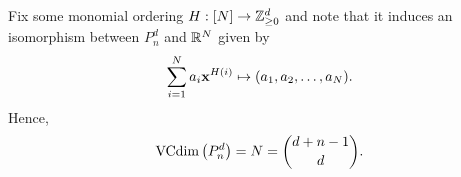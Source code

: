 \begin{ex}
\begin{enumerate}
\begin{enumerate}[1.]
\begin{enumerate}[1.]
                          Fix some monomial ordering $H: [N] \to \mathbb{Z}_{\geq 0}^d$ and
                          note that it induces an isomorphism between
                          $P^d_n$ and $\mathbb{R}^N$ given by
                          \[
                            \sum_{i=1}^N a_i\mathbf{x}^{H(i)} \mapsto (a_1,a_2,\ldots,a_N).
                          \]
                          Hence,
                          \[
                            \operatorname{VCdim}\left(P^d_n\right)=N={d+n-1 \choose d}.
                          \]
                  \end{enumerate}
          \end{enumerate}
  \end{enumerate}
\end{ex}